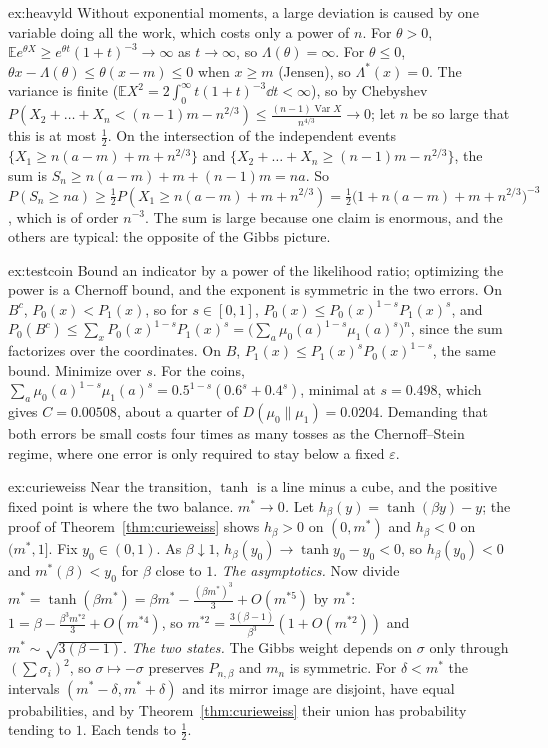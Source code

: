 \begin{solution}{ex:heavyld}
\idea Without exponential moments, a large deviation is caused by one variable doing all the work, which costs only a power of $n$.
\writeup For $\theta>0$, $\mathbb Ee^{\theta X}\ge e^{\theta t}(1+t)^{-3}\to\infty$ as $t\to\infty$, so $\Lambda(\theta)=\infty$. For $\theta\le0$, $\theta x-\Lambda(\theta)\le\theta(x-m)\le0$ when $x\ge m$ (Jensen), so $\Lambda^*(x)=0$.
The variance is finite ($\mathbb EX^2=2\int_0^\infty t(1+t)^{-3}\dd t<\infty$), so by Chebyshev $P(X_2+\dots+X_n<(n-1)m-n^{2/3})\le\frac{(n-1)\operatorname{Var}X}{n^{4/3}}\to0$; let $n$ be so
large that this is at most $\frac12$. On the intersection of the independent events $\{X_1\ge n(a-m)+m+n^{2/3}\}$ and $\{X_2+\dots+X_n\ge(n-1)m-n^{2/3}\}$, the sum is
$S_n\ge n(a-m)+m+(n-1)m=na$. So $P(S_n\ge na)\ge\frac12P(X_1\ge n(a-m)+m+n^{2/3})=\frac12\bigl(1+n(a-m)+m+n^{2/3}\bigr)^{-3}$, which is of order $n^{-3}$. The sum is large because one claim is enormous, and the others are
typical: the opposite of the Gibbs picture.
\end{solution}

\begin{solution}{ex:testcoin}
\idea Bound an indicator by a power of the likelihood ratio; optimizing the power is a Chernoff bound, and the exponent is symmetric in the two errors.
\writeup On $B^c$, $P_0(x)<P_1(x)$, so for $s\in[0,1]$, $P_0(x)\le P_0(x)^{1-s}P_1(x)^s$, and $P_0(B^c)\le\sum_xP_0(x)^{1-s}P_1(x)^s=\bigl(\sum_a\mu_0(a)^{1-s}\mu_1(a)^s\bigr)^n$, since the sum
factorizes over the coordinates. On $B$, $P_1(x)\le P_1(x)^sP_0(x)^{1-s}$, the same bound. Minimize over $s$. For the coins, $\sum_a\mu_0(a)^{1-s}\mu_1(a)^s=0.5^{1-s}(0.6^s+0.4^s)$, minimal at $s=0.498$, which gives $C=0.00508$, about a quarter of $D(\mu_0\|\mu_1)=0.0204$.
Demanding that both errors be small costs four times as many tosses as the Chernoff--Stein regime, where one error is only required to stay below a fixed $\varepsilon$.
\end{solution}

\begin{solution}{ex:curieweiss}
\idea Near the transition, $\tanh$ is a line minus a cube, and the positive fixed point is where the two balance.
\writeup \emph{$m^*\to0$.} Let $h_\beta(y)=\tanh(\beta y)-y$; the proof of Theorem~\ref{thm:curieweiss} shows $h_\beta>0$ on $(0,m^*)$ and $h_\beta<0$ on $(m^*,1]$. Fix
$y_0\in(0,1)$. As $\beta\downarrow1$, $h_\beta(y_0)\to\tanh y_0-y_0<0$, so $h_\beta(y_0)<0$ and $m^*(\beta)<y_0$ for $\beta$ close to $1$.
\emph{The asymptotics.} Now divide $m^*=\tanh(\beta m^*)=\beta m^*-\frac{(\beta m^*)^3}3+O(m^{*5})$ by $m^*$: $1=\beta-\frac{\beta^3m^{*2}}3+O(m^{*4})$, so
$m^{*2}=\frac{3(\beta-1)}{\beta^3}(1+O(m^{*2}))$ and $m^*\sim\sqrt{3(\beta-1)}$.
\emph{The two states.} The Gibbs weight depends on $\sigma$ only through $(\sum\sigma_i)^2$, so $\sigma\mapsto-\sigma$ preserves $P_{n,\beta}$ and $m_n$ is symmetric. For $\delta<m^*$ the intervals
$(m^*-\delta,m^*+\delta)$ and its mirror image are disjoint, have equal probabilities, and by Theorem~\ref{thm:curieweiss} their union has probability tending to $1$. Each tends to $\frac12$.
\end{solution}

